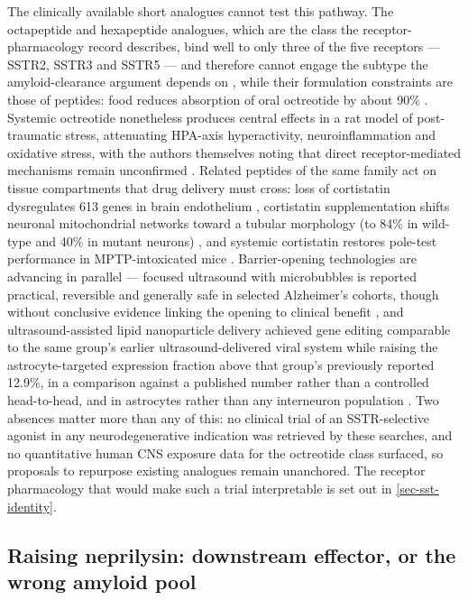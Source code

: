 \documentclass[11pt]{article}
\begin{document}
The clinically available short analogues cannot test this pathway. The octapeptide and hexapeptide analogues, which are the class the receptor-pharmacology record describes, bind well to only three of the five receptors --- SSTR2, SSTR3 and SSTR5 --- and therefore cannot engage the subtype the amyloid-clearance argument depends on \citep{Patel1999}, while their formulation constraints are those of peptides: food reduces absorption of oral octreotide by about 90\% \citep{Periferakis2024}. Systemic octreotide nonetheless produces central effects in a rat model of post-traumatic stress, attenuating HPA-axis hyperactivity, neuroinflammation and oxidative stress, with the authors themselves noting that direct receptor-mediated mechanisms remain unconfirmed \citep{Motamedy2026}. Related peptides of the same family act on tissue compartments that drug delivery must cross: loss of cortistatin dysregulates 613 genes in brain endothelium \citep{CastilloGonzalez2023}, cortistatin supplementation shifts neuronal mitochondrial networks toward a tubular morphology (to 84\% in wild-type and 40\% in mutant neurons) \citep{GonzalezGarcia2026}, and systemic cortistatin restores pole-test performance in MPTP-intoxicated mice \citep{SerranoMartinez2024}. Barrier-opening technologies are advancing in parallel --- focused ultrasound with microbubbles is reported practical, reversible and generally safe in selected Alzheimer's cohorts, though without conclusive evidence linking the opening to clinical benefit \citep{Desale2026}, and ultrasound-assisted lipid nanoparticle delivery achieved gene editing comparable to the same group's earlier ultrasound-delivered viral system while raising the astrocyte-targeted expression fraction above that group's previously reported 12.9\%, in a comparison against a published number rather than a controlled head-to-head, and in astrocytes rather than any interneuron population \citep{Zheng2026}. Two absences matter more than any of this: no clinical trial of an SSTR-selective agonist in any neurodegenerative indication was retrieved by these searches, and no quantitative human CNS exposure data for the octreotide class surfaced, so proposals to repurpose existing analogues remain unanchored. The receptor pharmacology that would make such a trial interpretable is set out in \ref{sec-sst-identity}.

\subsection{Raising neprilysin: downstream effector, or the wrong amyloid pool}
\label{sec-10-neprilysin}
\end{document}
